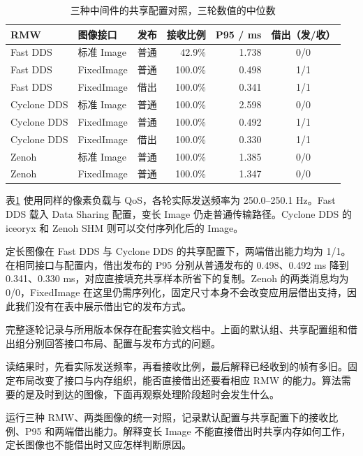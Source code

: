 \begin{example}
\begin{table}[htbp]
\centering
\small
\caption{三种中间件的共享配置对照，三轮数值的中位数}
\label{tab:ros2-image-types-shared}
\begin{tabular}{lllrrc}
\toprule
RMW & 图像接口 & 发布 & 接收比例 & P95 / ms & 借出（发/收）\\
\midrule
Fast DDS & 标准 Image & 普通 & 42.9\% & 1.738 & 0/0\\
Fast DDS & FixedImage & 普通 & 100.0\% & 0.498 & 1/1\\
Fast DDS & FixedImage & 借出 & 100.0\% & 0.341 & 1/1\\
\midrule
Cyclone DDS & 标准 Image & 普通 & 100.0\% & 2.598 & 0/0\\
Cyclone DDS & FixedImage & 普通 & 100.0\% & 0.492 & 1/1\\
Cyclone DDS & FixedImage & 借出 & 100.0\% & 0.330 & 1/1\\
\midrule
Zenoh & 标准 Image & 普通 & 100.0\% & 1.385 & 0/0\\
Zenoh & FixedImage & 普通 & 100.0\% & 1.347 & 0/0\\
\bottomrule
\end{tabular}
\end{table}
表\ref{tab:ros2-image-types-shared} 使用同样的像素负载与 QoS，各轮实际发送频率为 250.0--250.1 Hz。Fast DDS 载入 Data Sharing 配置，变长 Image 仍走普通传输路径。Cyclone DDS 的 iceoryx 和 Zenoh SHM 则可以交付序列化后的 Image。

定长图像在 Fast DDS 与 Cyclone DDS 的共享配置下，两端借出能力均为 1/1。在相同接口与配置内，借出发布的 P95 分别从普通发布的 0.498、0.492 ms 降到 0.341、0.330 ms，对应直接填充共享样本所省下的复制。Zenoh 的两类消息均为 0/0，FixedImage 在这里仍需序列化，固定尺寸本身不会改变应用层借出支持，因此我们没有在表中展示借出它的发布方式。

完整逐轮记录与所用版本保存在配套实验文档中。上面的默认组、共享配置组和借出组分别回答接口布局、配置与发布方式的问题。


读结果时，先看实际发送频率，再看接收比例，最后解释已经收到的帧有多旧。固定布局改变了接口与内存组织，能否直接借出还要看相应 RMW 的能力。算法需要的是及时到达的图像，下面再观察处理阶段超时会发生什么。
\end{example}

\begin{exercise}
\label{ex:v2-ros-fixed-image}
运行三种 RMW、两类图像的统一对照，记录默认配置与共享配置下的接收比例、P95 和两端借出能力。解释变长 Image 不能直接借出时共享内存如何工作，定长图像也不能借出时又应怎样判断原因。
\end{exercise}

